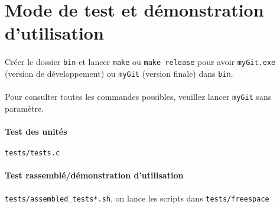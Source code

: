 \documentclass{report}
\begin{document}
\section*{Mode de test et démonstration d'utilisation}

\paragraph{} Créer le dossier \verb|bin| et lancer \verb|make| ou \verb|make release|
pour avoir \verb|myGit.exe| (version de développement) ou \verb|myGit| (version finale) dans \verb|bin|.

\paragraph{} Pour consulter toutes les commandes possibles, veuillez lancer \verb|myGit| sans paramètre.

\paragraph{Test des unités} \verb|tests/tests.c|
\paragraph{Test rassemblé/démonstration d'utilisation}\verb|tests/assembled_tests*.sh|, 
on lance les scripts dans \verb|tests/freespace|
\end{document}
